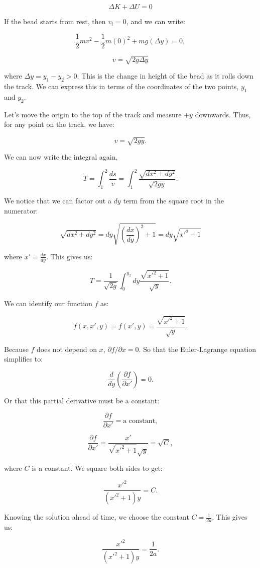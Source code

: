 \documentclass[11pt]{article}
\begin{document}
\[\Delta K + \Delta U = 0\]

If the bead starts from rest, then \(v_i = 0\), and we can write:

\[\dfrac{1}{2}mv^2 - \dfrac{1}{2}m(0)^2 + mg(\Delta y) = 0,\]

\[v = \sqrt{2g\Delta y}\]

where \(\Delta y = y_1 - y_2 > 0\). This is the change in height of the
bead as it rolls down the track. We can express this in terms of the
coordinates of the two points, \(y_1\) and \(y_2\).

Let's move the origin to the top of the track and measure \(+y\)
downwards. Thus, for any point on the track, we have:

\[v = \sqrt{2gy}.\]

We can now write the integral again,

\[T = \int_{1}^{2} \dfrac{ds}{v} = \int_{1}^{2} \dfrac{\sqrt{dx^2 + dy^2}}{\sqrt{2gy}}.\]

We notice that we can factor out a \(dy\) term from the square root in
the numerator:

\[\sqrt{dx^2 + dy^2} = dy\sqrt{\left(\frac{dx}{dy}\right)^2 + 1} = dy \sqrt{x'^2 + 1}\]

where \(x' = \frac{dx}{dy}\). This gives us:

\[T = \dfrac{1}{\sqrt{2g}}\int_{0}^{y_2} dy \dfrac{\sqrt{x'^2 + 1}}{\sqrt{y}}.\]

We can identify our function \(f\) as:

\[f(x,x',y) = f(x',y) = \dfrac{\sqrt{x'^2 + 1}}{\sqrt{y}}.\]

Because \(f\) does not depend on \(x\), \(\partial f/\partial x = 0\).
So that the Euler-Lagrange equation simplifies to:

\[\dfrac{d}{dy}\left(\dfrac{\partial f}{\partial x'}\right) = 0.\]

Or that this partial derivative must be a constant:

\[\dfrac{\partial f}{\partial x'} = \textrm{a constant},\]

\[\dfrac{\partial f}{\partial x'} = \dfrac{x'}{\sqrt{x'^2 + 1}\sqrt{y}} = \sqrt{C},\]

where \(C\) is a constant. We square both sides to get:

\[\dfrac{x'^2}{(x'^2 + 1)y} = C.\]

Knowing the solution ahead of time, we choose the constant
\(C = \frac{1}{2a}\). This gives us:

\[\dfrac{x'^2}{(x'^2 + 1)y} = \frac{1}{2a}.\]
\end{document}
